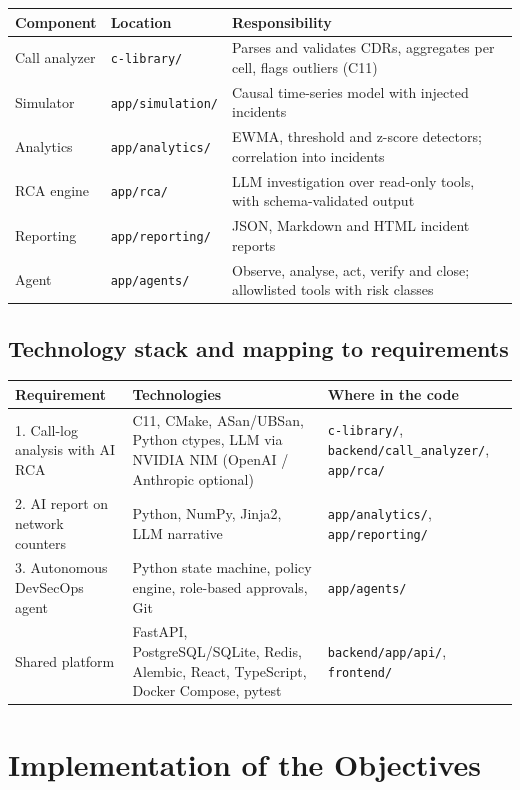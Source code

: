 \documentclass[11pt,a4paper]{article}
\begin{document}
\begin{tabularx}{\linewidth}{@{}llX@{}}
\toprule
Component & Location & Responsibility\\\midrule
Call analyzer & \texttt{c-library/} & Parses and validates CDRs, aggregates per cell, flags outliers (C11)\\
Simulator & \texttt{app/simulation/} & Causal time-series model with injected incidents\\
Analytics & \texttt{app/analytics/} & EWMA, threshold and z-score detectors; correlation into incidents\\
RCA engine & \texttt{app/rca/} & LLM investigation over read-only tools, with schema-validated output\\
Reporting & \texttt{app/reporting/} & JSON, Markdown and HTML incident reports\\
Agent & \texttt{app/agents/} & Observe, analyse, act, verify and close; allowlisted tools with risk classes\\
\bottomrule
\end{tabularx}

\subsection*{Technology stack and mapping to requirements}
\begin{tabularx}{\linewidth}{@{}lXX@{}}
\toprule
Requirement & Technologies & Where in the code\\\midrule
1. Call-log analysis with AI RCA & C11, CMake, ASan/UBSan, Python ctypes, LLM via NVIDIA NIM (OpenAI / Anthropic optional) & \texttt{c-library/}, \texttt{backend/call\_analyzer/}, \texttt{app/rca/}\\
2. AI report on network counters & Python, NumPy, Jinja2, LLM narrative & \texttt{app/analytics/}, \texttt{app/reporting/}\\
3. Autonomous DevSecOps agent & Python state machine, policy engine, role-based approvals, Git & \texttt{app/agents/}\\
Shared platform & FastAPI, PostgreSQL/SQLite, Redis, Alembic, React, TypeScript, Docker Compose, pytest & \texttt{backend/app/api/}, \texttt{frontend/}\\
\bottomrule
\end{tabularx}

\section{Implementation of the Objectives}
\end{document}
